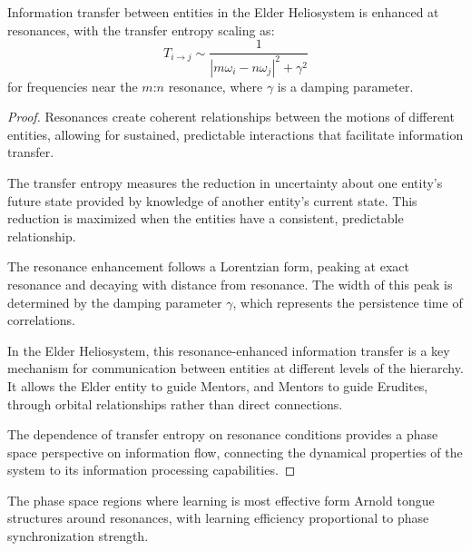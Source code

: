\begin{theorem}
Information transfer between entities in the Elder Heliosystem is enhanced at resonances, with the transfer entropy scaling as:
\begin{equation}
T_{i \to j} \sim \frac{1}{|m\omega_i - n\omega_j|^2 + \gamma^2}
\end{equation}
for frequencies near the $m$:$n$ resonance, where $\gamma$ is a damping parameter.
\end{theorem}

\begin{proof}
Resonances create coherent relationships between the motions of different entities, allowing for sustained, predictable interactions that facilitate information transfer.

The transfer entropy measures the reduction in uncertainty about one entity's future state provided by knowledge of another entity's current state. This reduction is maximized when the entities have a consistent, predictable relationship.

The resonance enhancement follows a Lorentzian form, peaking at exact resonance and decaying with distance from resonance. The width of this peak is determined by the damping parameter $\gamma$, which represents the persistence time of correlations.

In the Elder Heliosystem, this resonance-enhanced information transfer is a key mechanism for communication between entities at different levels of the hierarchy. It allows the Elder entity to guide Mentors, and Mentors to guide Erudites, through orbital relationships rather than direct connections.

The dependence of transfer entropy on resonance conditions provides a phase space perspective on information flow, connecting the dynamical properties of the system to its information processing capabilities.
\end{proof}

\begin{theorem}
The phase space regions where learning is most effective form Arnold tongue structures around resonances, with learning efficiency proportional to phase synchronization strength.
\end{theorem}

